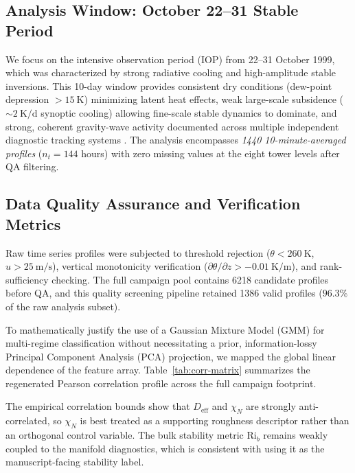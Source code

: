 \subsection{Analysis Window: October 22--31 Stable Period}

We focus on the intensive observation period (IOP) from 22--31 October 1999, which was characterized by strong radiative cooling and high-amplitude stable inversions. This 10-day window provides consistent dry conditions (dew-point depression $> \SI{15}{\kelvin}$) minimizing latent heat effects, weak large-scale subsidence ($\sim \SI{2}{\kelvin\per\day}$ synoptic cooling) allowing fine-scale stable dynamics to dominate, and strong, coherent gravity-wave activity documented across multiple independent diagnostic tracking systems \citep{Poulos2002}. The analysis encompasses \emph{1440 10-minute-averaged profiles} ($n_t = 144$ hours) with zero missing values at the eight tower levels after QA filtering.

\subsection{Data Quality Assurance and Verification Metrics}

Raw time series profiles were subjected to threshold rejection ($\theta < \SI{260}{\kelvin}$, $u > \SI{25}{\meter\per\second}$), vertical monotonicity verification ($\partial \theta / \partial z > -\SI{0.01}{\kelvin\per\meter}$), and rank-sufficiency checking. The full campaign pool contains 6218 candidate profiles before QA, and this quality screening pipeline retained 1386 valid profiles ($96.3\%$ of the raw analysis subset).

To mathematically justify the use of a Gaussian Mixture Model (GMM) for multi-regime classification without necessitating a prior, information-lossy Principal Component Analysis (PCA) projection, we mapped the global linear dependence of the feature array. Table~\ref{tab:corr-matrix} summarizes the regenerated Pearson correlation profile across the full campaign footprint.


The empirical correlation bounds show that $D_{\mathrm{eff}}$ and $\chi_N$ are strongly anti-correlated, so $\chi_N$ is best treated as a supporting roughness descriptor rather than an orthogonal control variable. The bulk stability metric $\mathrm{Ri}_b$ remains weakly coupled to the manifold diagnostics, which is consistent with using it as the manuscript-facing stability label.

